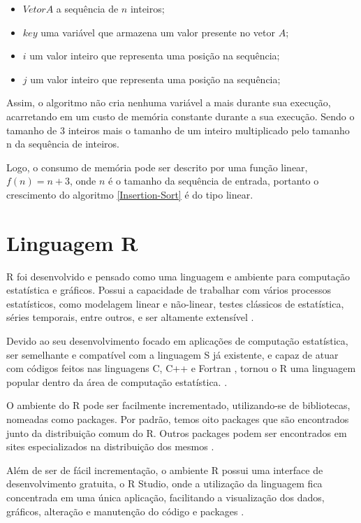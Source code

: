 \documentclass[
	12pt,				%
	openright,			%
	oneside,			%
	a4paper,			%
	english,			%
	brazil				%
	]{abntex2}
\begin{document}
\begin{itemize}
	\item $Vetor A$ a sequência de $n$ inteiros;
	\item $key$ uma variável  que armazena um valor presente no vetor $A$;
	\item $i$ um valor inteiro que representa uma posição na sequência;
	\item $j$ um valor inteiro que representa uma posição na sequência;
\end{itemize}

Assim, o algoritmo não cria nenhuma variável a mais durante sua execução, acarretando em um custo de memória constante durante a sua execução. 
Sendo o tamanho de 3 inteiros mais o tamanho de um inteiro multiplicado pelo tamanho n da sequência de inteiros.

Logo, o consumo de memória pode ser descrito por uma função linear, $f(n) = n + 3$, onde $n$ é o tamanho da sequência de entrada, portanto 
o crescimento do algoritmo \ref{Insertion-Sort} é do tipo linear.

\section{Linguagem R}

R foi desenvolvido e pensado como uma linguagem e ambiente para computação estatística e gráficos. Possui a capacidade de trabalhar com 
vários processos estatísticos, como modelagem linear e não-linear, testes clássicos de estatística, séries temporais, entre outros, 
e ser altamente extensível \cite{ling_r}.

Devido ao seu desenvolvimento focado em aplicações de computação estatística, ser semelhante e compatível com a linguagem S já existente, 
e capaz de atuar com códigos feitos nas linguagens C, C++ e Fortran \cite{ling_r}, tornou o R uma linguagem popular dentro da área 
de computação estatística. \cite{linguagem_r}.

O ambiente do R pode ser facilmente incrementado, utilizando-se de bibliotecas, nomeadas como packages. Por padrão, temos oito packages 
que são encontrados junto da distribuição comum do R. Outros packages podem ser encontrados em sites especializados na distribuição dos 
mesmos \cite{ling_r}.

Além de ser de fácil incrementação, o ambiente R possui uma interface de desenvolvimento gratuita, o R Studio, onde a utilização da 
linguagem fica concentrada em uma única aplicação, facilitando a visualização dos dados, gráficos, alteração e manutenção do código e 
packages \cite{rstudio}.
\end{document}
